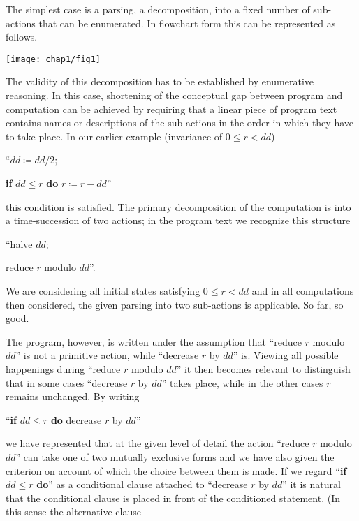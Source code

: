 The simplest case is a parsing, a decomposition, into a fixed number of sub-actions that can be enumerated. In flowchart form this can be represented as follows. 

\centerline{\texttt{[image: chap1/fig1]}}

The validity of this decomposition has to be established by enumerative reasoning. In this case, shortening of the conceptual gap between program and computation can be achieved by requiring that a linear piece of program text contains names or descriptions of the sub-actions in the order in which they have to take place. In our earlier example (invariance of $0 \leqslant r < dd$)
\medskip

{
	\setlength{\parindent}{8em}
	\hspace{-.4em}``$dd \coloneq dd/2;$
	
	\textbf{if} $dd \leqslant r$ \textbf{do} $r \coloneq r - dd$''
}
\medskip

\noindent
this condition is satisfied. The primary decomposition of the computation is into a time-succession of two actions; in the program text we recognize this structure
\medskip

{
	\setlength{\parindent}{8em}
	\hspace{-.4em}``halve $dd;$
	
	reduce $r$ modulo $dd$''.
}
\medskip

We are considering all initial states satisfying $0 \leqslant r < dd$ and in all computations then considered, the given parsing into two sub-actions is applicable. So far, so good.

The program, however, is written under the assumption that ``reduce $r$ modulo $dd$'' is not a primitive action, while ``decrease $r$ by $dd$'' is. Viewing all possible happenings during ``reduce $r$ modulo $dd$'' it then becomes relevant to distinguish that in some cases ``decrease $r$ by $dd$'' takes place, while in the other cases $r$ remains unchanged. By writing
\medskip

{
	\setlength{\parindent}{8em}
	\hspace{-.4em}``\textbf{if} $dd \leqslant r$ \textbf{do} decrease $r$ by $dd$''
}
\medskip

\noindent
we have represented that at the given level of detail the action ``reduce $r$ modulo $dd$'' can take one of two mutually exclusive forms and we have also given the criterion on account of which the choice between them is made. If we regard ``\textbf{if} $dd \leqslant r$ \textbf{do}'' as a conditional clause attached to ``decrease $r$ by $dd$'' it is natural that the conditional clause is placed in front of the conditioned statement. (In this sense the alternative clause
\medskip

